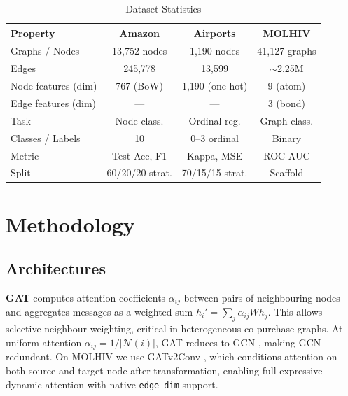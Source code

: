 \documentclass[conference]{IEEEtran}
\begin{document}
\begin{table}[t]
\caption{Dataset Statistics}
\label{tab:datasets}
\centering
\begin{tabular}{lccc}
\toprule
\textbf{Property} & \textbf{Amazon} & \textbf{Airports} & \textbf{MOLHIV} \\
\midrule
Graphs / Nodes        & 13,752 nodes   & 1,190 nodes   & 41,127 graphs \\
Edges                 & 245,778        & 13,599        & $\sim$2.25M  \\
Node features (dim)   & 767 (BoW)      & 1,190 (one-hot) & 9 (atom)    \\
Edge features (dim)   & ---            & ---           & 3 (bond)    \\
Task                  & Node class.    & Ordinal reg.  & Graph class. \\
Classes / Labels      & 10             & 0--3 ordinal  & Binary       \\
Metric                & Test Acc, F1   & Kappa, MSE    & ROC-AUC      \\
Split                 & 60/20/20 strat.& 70/15/15 strat.& Scaffold    \\
\bottomrule
\end{tabular}
\end{table}

\section{Methodology}

\subsection{Architectures}

\textbf{GAT} \cite{velickovic2018} computes attention coefficients $\alpha_{ij}$ between pairs of neighbouring nodes and aggregates messages as a weighted sum $h_i' = \sum_j \alpha_{ij} W h_j$. This allows selective neighbour weighting, critical in heterogeneous co-purchase graphs. At uniform attention $\alpha_{ij} = 1/|\mathcal{N}(i)|$, GAT reduces to GCN \cite{kipf2017}, making GCN redundant. On MOLHIV we use GATv2Conv \cite{brody2022}, which conditions attention on both source and target node after transformation, enabling full expressive dynamic attention with native \texttt{edge\_dim} support.
\end{document}
